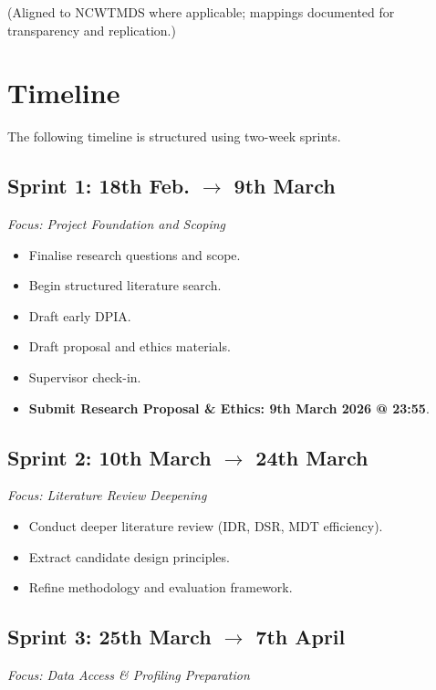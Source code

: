 \documentclass[12pt, a4paper, twoside]{article} %
\begin{document}
(Aligned to NCWTMDS where applicable; mappings documented for transparency and replication.) \citep{NHSDigital2026} 

\section{Timeline}
The following timeline is structured using two-week sprints.

\subsection{Sprint 1: 18th Feb. $\rightarrow$ 9th March}
\emph{Focus: Project Foundation and Scoping}

\begin{itemize}
  \item[$\square$] Finalise research questions and scope.
  \item[$\square$] Begin structured literature search.
  \item[$\square$] Draft early DPIA.
  \item[$\square$] Draft proposal and ethics materials.
  \item[$\square$] Supervisor check-in.
  \item[$\square$] \textbf{Submit Research Proposal \& Ethics: 9th March 2026 @ 23:55}.
\end{itemize}


\subsection{Sprint 2: 10th March $\rightarrow$ 24th March}
\emph{Focus: Literature Review Deepening}

\begin{itemize}
  \item[$\square$] Conduct deeper literature review (IDR, DSR, MDT efficiency).
  \item[$\square$] Extract candidate design principles.
  \item[$\square$] Refine methodology and evaluation framework.
\end{itemize}


\subsection{Sprint 3: 25th March $\rightarrow$ 7th April}
\emph{Focus: Data Access \& Profiling Preparation}
\end{document}
